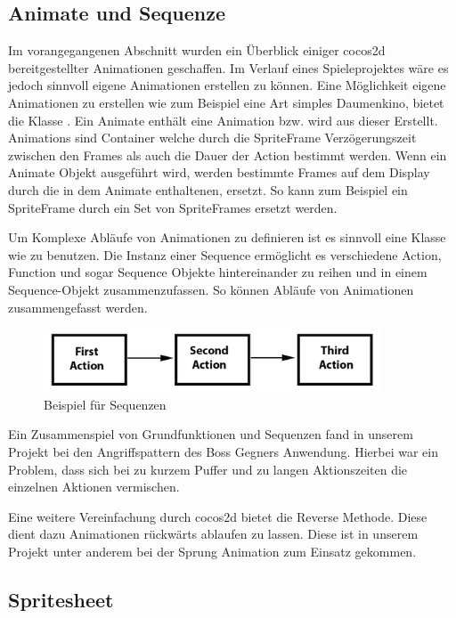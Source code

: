\subsection{Animate und Sequenze}
Im vorangegangenen Abschnitt wurden ein Überblick einiger cocos2d bereitgestellter Animationen geschaffen. Im Verlauf eines Spieleprojektes wäre es jedoch sinnvoll eigene Animationen erstellen zu können. Eine Möglichkeit eigene Animationen zu erstellen wie zum Beispiel eine Art simples Daumenkino, bietet die Klasse . Ein Animate enthält eine Animation bzw. wird aus dieser Erstellt. Animations sind Container welche durch die SpriteFrame Verzögerungszeit zwischen den Frames als auch die Dauer der Action bestimmt werden. Wenn ein Animate Objekt ausgeführt wird, werden bestimmte Frames auf dem Display durch die in dem Animate enthaltenen, ersetzt. So kann zum Beispiel ein SpriteFrame durch ein Set von SpriteFrames ersetzt werden.

Um Komplexe Abläufe von Animationen zu definieren ist es sinnvoll eine Klasse wie  zu benutzen. Die Instanz einer Sequence ermöglicht es verschiedene Action, Function und sogar Sequence Objekte hintereinander zu reihen und in einem Sequence-Objekt zusammenzufassen. So können Abläufe von Animationen zusammengefasst werden.

\begin{figure}[H]
 \centering
  \includegraphics[width=10cm]{resources/sequence}
  \caption{Beispiel für Sequenzen}
  \label{fig:sequence} 
\end{figure}

Ein Zusammenspiel von Grundfunktionen und Sequenzen fand in unserem Projekt bei den Angriffspattern des Boss Gegners Anwendung. Hierbei war ein Problem, dass sich bei zu kurzem Puffer und zu langen Aktionszeiten die einzelnen Aktionen vermischen.

Eine weitere Vereinfachung durch cocos2d bietet die Reverse Methode. Diese dient dazu Animationen rückwärts ablaufen zu lassen. Diese ist in unserem Projekt unter anderem bei der Sprung Animation zum Einsatz gekommen.


\subsection{Spritesheet}


